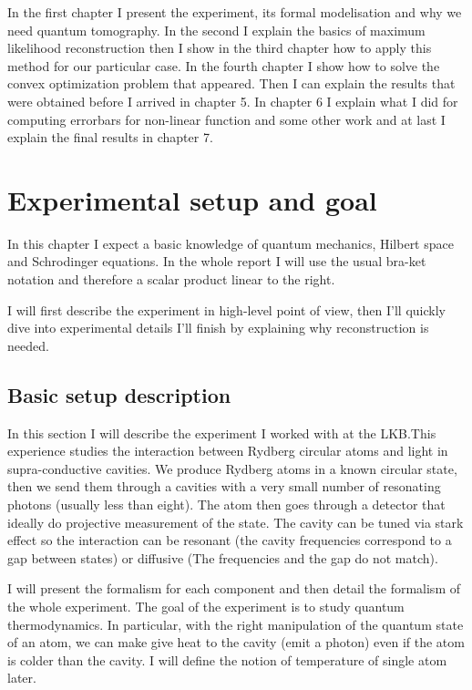 \documentclass[10pt,a4paper]{report}
\theoremstyle{plain}
\theoremstyle{definition}
\theoremstyle{remark}
\begin{document}
In the first chapter I
present the experiment, its formal modelisation and why we need quantum tomography. In the
second I explain the basics of maximum likelihood reconstruction then I show in
the third chapter how to apply this method for our particular case. In the
fourth chapter I show how to solve the convex optimization problem that appeared. Then I can
explain the results that were obtained before I arrived in chapter 5. In chapter 6 I
explain what I did for computing errorbars for non-linear function and some other work and at last
I explain the final results in chapter 7.

\vfill



\chapter{Experimental setup and goal}

In this chapter I expect a basic knowledge of quantum mechanics, Hilbert space and
Schrodinger equations. In the whole report I will use the usual bra-ket notation
and therefore a scalar product linear to the right.

I will first describe the experiment in high-level point of view, then I'll
quickly dive into experimental details I'll finish by explaining why
reconstruction is needed.

\section{Basic setup description}

In this section I will describe the experiment I worked with at the LKB.\@ This
experience studies the interaction between Rydberg circular atoms and light in
supra-conductive cavities.
We produce Rydberg atoms in a known circular state, then we send them through a
cavities with a very small number of resonating photons (usually less than
eight). The atom then goes through a detector that ideally do projective
measurement of the state. The cavity can be tuned via stark effect so the
interaction can be resonant (the cavity frequencies correspond to a gap between
states) or diffusive (The frequencies and the gap do not match).

I will present the formalism for each component and then detail the formalism of
the whole experiment. The goal of the experiment is to study quantum
thermodynamics. In particular, with the right manipulation of the quantum state
of an atom, we can make give heat to the cavity (emit a photon) even if the atom
is colder than the cavity. I will define the notion of temperature of single
atom later.
\end{document}
